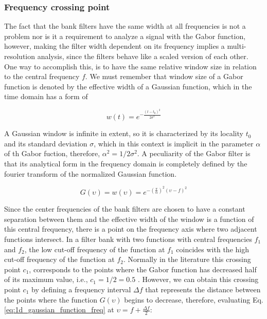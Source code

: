\subsubsection{Frequency crossing point}

The fact that the bank filters have the same width at all frequencies is not a problem nor is it a requirement to analyze a signal with the Gabor function, however, making the filter width dependent on its frequency implies a multi-resolution analysis, since the filters behave like a scaled version of each other. One way to accomplish this, is to have the same relative window size in relation to the central frequency $f$. We must remember that window size of a Gabor function is denoted by the effective width of a Gaussian function, which in the time domain has a form of

\begin{equation}\label{eq:1d_gaussian_function_time}
    w(t)=e^{-\frac{(t-t_0)^2}{2\sigma^2}}
\end{equation}

A Gaussian window is infinite in extent, so it is characterized by its locality $t_0$ and its standard deviation $\sigma$, which in this context is implicit in the parameter $\alpha$ of th Gabor fuction, therefore, $\alpha^2 = 1 / 2 \sigma^2$. 
A peculiarity of the Gabor filter is that its analytical form in the frequency domain is completely defined by the fourier transform of the normalized Gaussian function.

\begin{equation}\label{eq:1d_gaussian_function_freq}
    G(\upsilon) = w(\upsilon) = e ^{-\left(\frac{\pi}{\alpha}\right) ^{2} (\upsilon-f)^2}
\end{equation}

Since the center frequencies of the bank filters are chosen to have a constant separation between them and the effective width of the window is a function of this central frequency, there is a point on the frequency axis where two adjacent functions intersect. In a filter bank with two functions with central frequencies $f_1$ and $f_2$, the low cut-off frequency of the function at $f_1$ coincides with the high cut-off frequency of the function at $f_2$. Normally in the literature this crossing point $c_1$, corresponds to the points where the Gabor function has decreased half of its maximum value, i.e., $c_1= 1/2=0.5$ \cite{Granlund:CGIP:1978}. However, we can obtain this crossing point $c_1$ by defining a frequency interval $\Delta f$ that represents the distance between the points where the function $G(\upsilon)$ begins to decrease, therefore, evaluating Eq. \eqref{eq:1d_gaussian_function_freq} at $\upsilon = f + \frac{\Delta f}{2}$:

